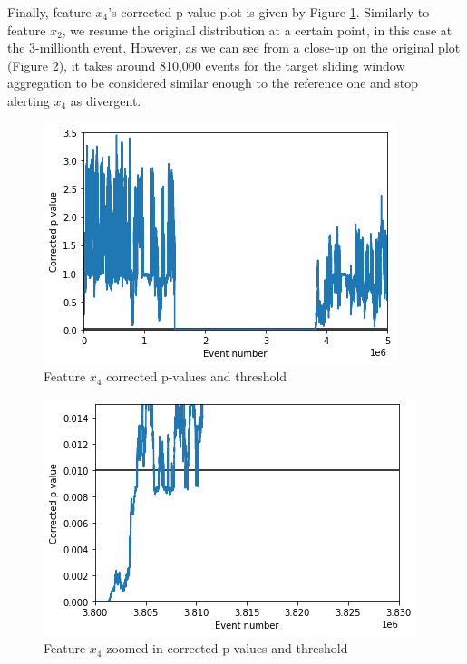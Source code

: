 \documentclass[sigconf]{acmart}
\begin{document}
Finally, feature $x_4$'s corrected p-value plot is given by Figure \ref{fig:x4-corrected-pvalues}. Similarly to feature $x_2$, we resume the original distribution at a certain point, in this case at the 3-millionth event. However, as we can see from a close-up on the original plot (Figure \ref{fig:x4-corrected-pvalues-zoom}), it takes around 810,000 events for the target sliding window aggregation to be considered similar enough to the reference one and stop alerting $x_4$ as divergent.
\begin{figure}[!htb]
    \begin{center}
      \includegraphics[scale=0.5]{figures/x4-corrected-pvalues.png}
      \caption{Feature $x_4$ corrected p-values and threshold}
      \label{fig:x4-corrected-pvalues}
    \end{center}
\end{figure}
\begin{figure}[!htb]
    \begin{center}
      \includegraphics[scale=0.5]{figures/x4-corrected-pvalues-zoom2.png}
      \caption{Feature $x_4$ zoomed in corrected p-values and threshold}
      \label{fig:x4-corrected-pvalues-zoom}
    \end{center}
\end{figure}
\end{document}
